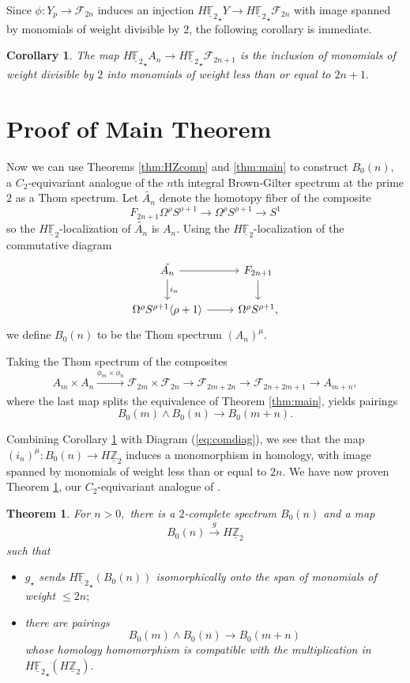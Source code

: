 \documentclass[]{amsart}  %
\newtheorem{theorem}{Theorem}[section]
\newtheorem{cor}[equation]{Corollary}
\theoremstyle{definition}
\numberwithin{equation}{section}
\numberwithin{figure}{section}
\newcommand{\mF}{{\mathbb F}}
\newcommand{\mZ}{{\mathbb Z}}
\newcommand{\cF}{{\mathcal F}}
\newcommand{\umF}{\underline{\mF}}
\newcommand{\umZ}{\underline{\mZ}}
\newcommand{\0}{\langle 0 \rangle}
\begin{document}
Since $\phi: Y_{p} \rightarrow \cF_{2n}$ induces an injection $H {\umF_2}_\star Y \to H {\umF_2}_\star \cF_{2n}$ with image spanned by monomials of weight divisible by $2$, the following corollary is immediate.
 \begin{cor} \label{cor:monomialwt}
    The map $H {\umF_2}_\star A_n \rightarrow H {\umF_2}_\star\cF_{2n + 1 }$ is the inclusion of monomials of weight divisible by $2$ into monomials of weight less than or equal to $2n + 1.$
 \end{cor}

 \section{Proof of Main Theorem}

Now we can use Theorems \ref{thm:HZcomp} and \ref{thm:main} to construct $B_0(n),$ a $C_2$-equivariant analogue of the $n$th integral Brown-Gilter spectrum at the prime $2$ as a Thom spectrum.
Let $\tilde{A_n}$ denote the homotopy fiber of the composite
 $$F_{2n + 1} \Omega^\rho S^{\rho + 1} \to \Omega^\rho S^{\rho + 1} \to S^1$$
 so the $H \umF_2$-localization of $\tilde{A_n}$ is $A_n.$
Using the $H \umF_2$-localization of the commutative diagram
	\begin{equation} \label{eq:comdiag}
		\begin{tikzcd}
			\tilde{A_n} \arrow[r] \arrow[d, "i_n"]{} & F_{2n + 1} \arrow[d] \\
			\Omega^\rho S^{\rho + 1} \langle \rho + 1 \rangle \arrow[r] & \Omega^\rho S^{\rho + 1},
		\end{tikzcd}
	\end{equation}
we define $B_0(n)$ to be the Thom spectrum $(A_n)^{{\mu}}.$ 
	
	Taking the Thom spectrum of the composites
	$$ A_m \times A_n \xrightarrow[]{\phi_m \times \phi_n} \cF_{2m} \times \cF_{2n} \to \cF_{2m + 2n} \to \cF_{2n + 2m + 1} \to A_{m + n},$$
	where the last map splits the equivalence of Theorem \ref{thm:main}, yields pairings 
 $$B_0(m) \wedge B_0(n) \to B_0( m + n).$$

Combining Corollary \ref{cor:monomialwt} with Diagram (\ref{eq:comdiag}), we see that the map ${(i_n)}^{{\mu}} : B_0(n) \to H \umZ_2$ induces a monomorphism in homology, with image spanned by monomials of weight less than or equal to $2n$. We have now proven Theorem \ref{thm:C2intBGspectra}, our $C_2$-equivariant analogue of \cite[Theorem~1.5(i),(ii)]{CDGM1988}.
	\begin{theorem}\label{thm:C2intBGspectra}
		For $n > 0,$ there is a $2$-complete spectrum $B_0(n)$ and a map 
		$$B_0(n) \xrightarrow[]{g} H {\umZ_{2}} $$
		such that
		\begin{itemize}
			\item[(i)] $g_\star$ sends $H {\umF_2}_\star(B_0(n))$ isomorphically onto the span of monomials of weight $\leq 2n;$
			\item[(ii)] there are pairings
			$$ B_0(m) \wedge B_0(n) \to B_0 (m + n) $$
			whose homology homomorphism is compatible with the multiplication in $H {\umF_2}_\star ( H \umZ_2 ).$
		\end{itemize}
	\end{theorem}
 
\end{document}

